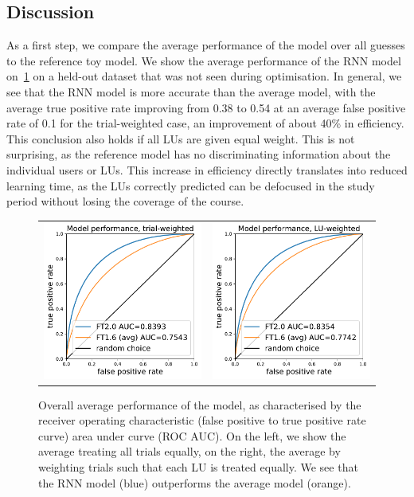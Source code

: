 \subsection{Discussion}

As a first step, we compare the average performance of the model over all guesses to the reference toy model. We show the average performance of the RNN model on~\cref{fig:roc} on a held-out dataset that was not seen during optimisation. In general, we see that the RNN model is more accurate than the average model, with the average true positive rate improving from 0.38 to 0.54 at an average false positive rate of 0.1 for the trial-weighted case, an improvement of about 40\% in efficiency. This conclusion also holds if all LUs are given equal weight. This is not surprising, as the reference model has no discriminating information about the individual users or LUs. This increase in efficiency directly translates into reduced learning time, as the LUs correctly predicted can be defocused in the study period without losing the coverage of the course.

\begin{figure}[ht]
\centering
\begin{tabular}{cc}
\includegraphics[width=0.4\linewidth]{figures/lingvist/roc_trial.pdf} &
\includegraphics[width=0.4\linewidth]{figures/lingvist/roc_lu.pdf} \\
\end{tabular}
\caption[Overall knowledge estimation model performance]{Overall average performance of the model, as characterised by the receiver operating characteristic (false positive to true positive rate curve) area under curve (ROC AUC). On the left, we show the average treating all trials equally, on the right, the average by weighting trials such that each LU is treated equally. We see that the RNN model (blue) outperforms the average model (orange).} 
\label{fig:roc} 
\end{figure} 

